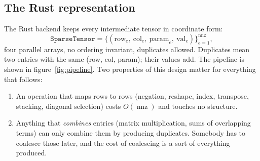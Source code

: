 \documentclass[11pt,a4paper]{article}
\newcommand{\nnz}{\operatorname{nnz}}
\newcommand{\code}[1]{\texttt{#1}}
\begin{document}
\subsection{The Rust representation}

The Rust backend keeps every intermediate tensor in coordinate form:
\begin{equation}
  \label{eq:coo}
  \code{SparseTensor} = \big\{(\text{row}_e,\ \text{col}_e,\ \text{param}_e,\ \text{val}_e)\big\}_{e=1}^{\nnz},
\end{equation}
four parallel arrays, no ordering invariant, duplicates allowed. Duplicates mean two entries with the
same (row, col, param); their values add. The pipeline is shown in figure~\ref{fig:pipeline}. Two
properties of this design matter for everything that follows:
\begin{enumerate}
  \item An operation that maps rows to rows (negation, reshape, index, transpose, stacking, diagonal
  selection) costs $O(\nnz)$ and touches no structure.
  \item Anything that \emph{combines} entries (matrix multiplication, sums of overlapping terms) can
  only combine them by producing duplicates. Somebody has to coalesce those later, and the cost of
  coalescing is a sort of everything produced.
\end{enumerate}
\end{document}
